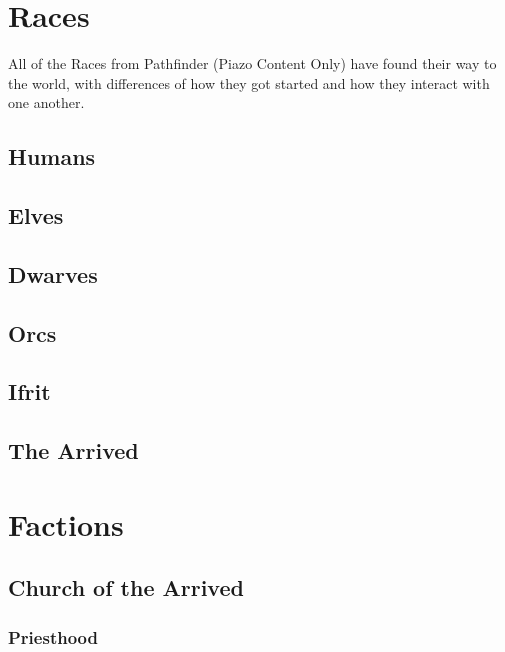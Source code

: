 \documentclass[letterpaper,twocolumn,openany,nodeprecatedcode]{dndbook}
\begin{document}
\chapter{Races}
All of the Races from Pathfinder (Piazo Content Only) have found their way to the world, with differences of how they got started and how they interact with one another.


\section{Humans}



\section{Elves}



\section{Dwarves}



\section{Orcs}



\section{Ifrit}



\section{The Arrived}







\chapter{Factions}

\section{Church of the Arrived}
    \subsection{Priesthood}
    
\end{document}

